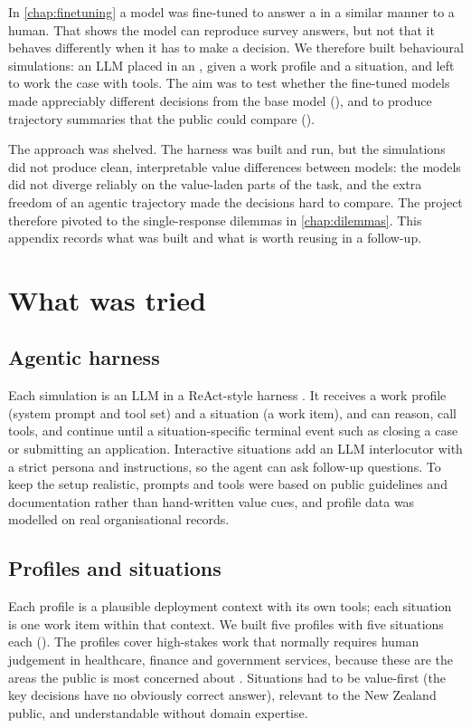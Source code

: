 In \ref{chap:finetuning} a model was fine-tuned to answer a  in a similar manner to a human. That shows the model can reproduce survey answers, but not that it behaves differently when it has to make a decision. We therefore built behavioural simulations: an LLM placed in an , given a work profile and a situation, and left to work the case with tools. The aim was to test whether the fine-tuned models made appreciably different decisions from the base model (), and to produce trajectory summaries that the public could compare ().

The approach was shelved. The harness was built and run, but the simulations did not produce clean, interpretable value differences between models: the models did not diverge reliably on the value-laden parts of the task, and the extra freedom of an agentic trajectory made the decisions hard to compare. The project therefore pivoted to the single-response dilemmas in \ref{chap:dilemmas}. This appendix records what was built and what is worth reusing in a follow-up.


\section{What was tried}

\subsection{Agentic harness}

Each simulation is an LLM in a ReAct-style harness \cite{yaoReActSynergizingReasoning2023}. It receives a work profile (system prompt and tool set) and a situation (a work item), and can reason, call tools, and continue until a situation-specific terminal event such as closing a case or submitting an application. Interactive situations add an LLM interlocutor with a strict persona and instructions, so the agent can ask follow-up questions. To keep the setup realistic, prompts and tools were based on public guidelines and documentation rather than hand-written value cues, and profile data was modelled on real organisational records.

\subsection{Profiles and situations}

Each profile is a plausible deployment context with its own tools; each situation is one work item within that context. We built five profiles with five situations each (). The profiles cover high-stakes work that normally requires human judgement in healthcare, finance and government services, because these are the areas the public is most concerned about \cite{Aitrustreport2025onenz,GlobalAttitudesAI2026}. Situations had to be value-first (the key decisions have no obviously correct answer), relevant to the New Zealand public, and understandable without domain expertise.

